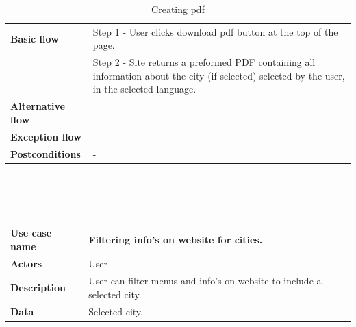 \begin{center}
\begin{table}[H]
\begin{tabular}{| m{3cm}| m{10cm} |}
            \hline
            \textbf{Basic flow}       & Step 1 - User clicks download pdf button at the top of the page.                                                                              \\
                                      & Step 2 - Site returns a preformed PDF containing all information about the city (if selected) selected by the user, in the selected language. \\
            \hline
            \textbf{Alternative flow} & -                                                                                                                                             \\
            \hline
            \textbf{Exception flow}   & -                                                                                                                                             \\
            \hline
            \textbf{Postconditions}   & -                                                                                                                                             \\
            \hline
        \end{tabular}
        \caption[Creating pdf]{Creating pdf}
    \end{table}
    ~\\~\\~\\
    \begin{table}[H]
        \begin{tabular}{| m{3cm}| m{10cm} |}
            \hline
            \textbf{Use case name}    & Filtering info's on website for cities.                                                                                                 \\
            \hline
            \textbf{Actors}           & User                                                                                                                                    \\
            \hline
            \textbf{Description}      & User can filter menus and info's on website to include a selected city.                                                                 \\
            \hline
            \textbf{Data}             & Selected city.                                                                                                                          \\

\end{tabular}
\end{table}
\end{center}
